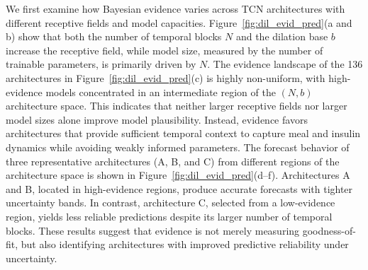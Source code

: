 \documentclass[preprint,12pt]{elsarticle}
\begin{document}
%
We first examine how Bayesian evidence varies across TCN architectures with different receptive fields and model capacities. 
Figure~\ref{fig:dil_evid_pred}(a and b) show that both the number of temporal blocks \(N\) and the dilation base \(b\) increase the receptive field, while model size, measured by the number of trainable parameters, is primarily driven by \(N\). 
%
The evidence landscape of the 136 architectures in Figure~\ref{fig:dil_evid_pred}(c) is highly non-uniform, with high-evidence models concentrated in an intermediate region of the \((N,b)\) architecture space. This indicates that neither larger receptive fields nor larger model sizes alone improve model plausibility. Instead, evidence favors architectures that provide sufficient temporal context to capture meal and insulin dynamics while avoiding weakly informed parameters.
%
The forecast behavior of three representative architectures (A, B, and C) from different regions of the architecture space is shown in Figure~\ref{fig:dil_evid_pred}(d--f). Architectures A and B, located in high-evidence regions, produce accurate forecasts with tighter uncertainty bands. In contrast, architecture C, selected from a low-evidence region, yields less reliable predictions despite its larger number of temporal blocks. These results suggest that evidence is not merely measuring goodness-of-fit, but also identifying architectures with improved predictive reliability under uncertainty.

%
\end{document}
